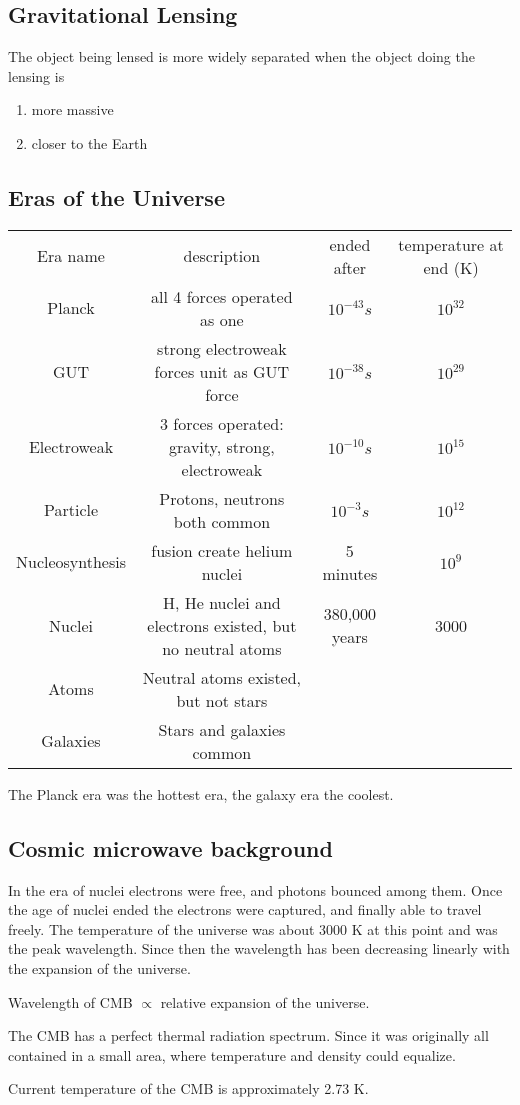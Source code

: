 \subsection{Gravitational Lensing}

The object being lensed is more widely separated when the object doing the lensing is
\begin{enumerate}
\item more massive
\item closer to the Earth
\end{enumerate}

\subsection{Eras of the Universe}

\begin{tabular}{c|c|c|c}
Era name        & description                                              & ended after   & temperature at end (K) \\
Planck          & all 4 forces operated as one                             & $10^{-43} s$  & $10^{32}$ \\
GUT             & strong electroweak forces unit as GUT force              & $10^{-38} s$  & $10^{29}$ \\
Electroweak     & 3 forces operated: gravity, strong, electroweak          & $10^{-10} s$  & $10^{15}$ \\
Particle        & Protons, neutrons both common                            & $10^{-3} s$   & $10^{12}$ \\
Nucleosynthesis & fusion create helium nuclei                              & 5 minutes     & $10^{9}$ \\
Nuclei          & H, He nuclei and electrons existed, but no neutral atoms & 380,000 years & 3000 \\
Atoms           & Neutral atoms existed, but not stars                     &               & \\
Galaxies        & Stars and galaxies common                                &               &
\end{tabular}

The Planck era was the hottest era, the galaxy era the coolest.

\subsection{Cosmic microwave background}
In the era of nuclei electrons were free, and photons bounced among them.  Once the age of nuclei ended the electrons were captured, and finally able to travel freely.  The temperature of the universe was about 3000 K at this point and was the peak wavelength.  Since then the wavelength has been decreasing linearly with the expansion of the universe.

Wavelength of CMB $\propto$ relative expansion of the universe.

The CMB has a perfect thermal radiation spectrum.  Since it was originally all contained in a small area, where temperature and density could equalize.

Current temperature of the CMB is approximately 2.73 K.
